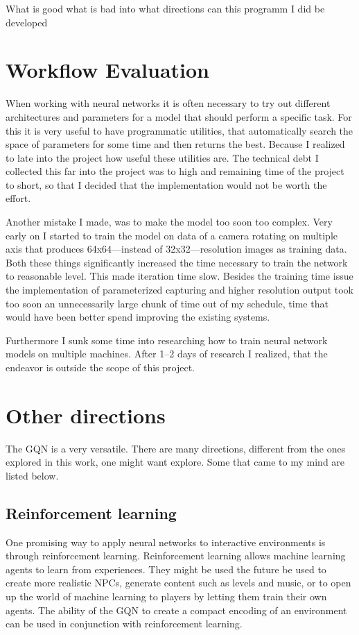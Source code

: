 What is good
what is bad
into what directions can this programm I did be developed

\section{Workflow Evaluation}
When working with neural networks it is often necessary to try out different architectures and parameters for a model that should perform a specific task. For this it is very useful to have programmatic utilities, that automatically search the space of parameters for some time and then returns the best. Because I realized to late into the project how useful these utilities are. The technical debt I collected this far into the project was to high and remaining time of the project to short, so that I decided that the implementation would not be worth the effort.

Another mistake I made, was to make the model too soon too complex. Very early on I started to train the model on data of a camera rotating on multiple axis that produces 64x64---instead of 32x32---resolution images as training data. Both these things significantly increased the time necessary to train the network to reasonable level. This made iteration time slow. Besides the training time issue the implementation of parameterized capturing and higher resolution output took too soon an unnecessarily large chunk of time out of my schedule, time that would have been better spend improving the existing systems.

Furthermore I sunk some time into researching how to train neural network models on multiple machines. After 1--2 days of research I realized, that the endeavor is outside the scope of this project.

\section{Other directions}
The GQN is a very versatile. There are many directions, different from the ones explored in this work, one might want explore. Some that came to my mind are listed below.

\subsection{Reinforcement learning}
One promising way to apply neural networks to interactive environments is through reinforcement learning. Reinforcement learning allows machine learning agents to learn from experiences. They might be used the future be used to create more realistic NPCs, generate content such as levels and music, or to open up the world of machine learning to players by letting them train their own agents. The ability of the GQN to create a compact encoding of an environment can be used in conjunction with reinforcement learning.

